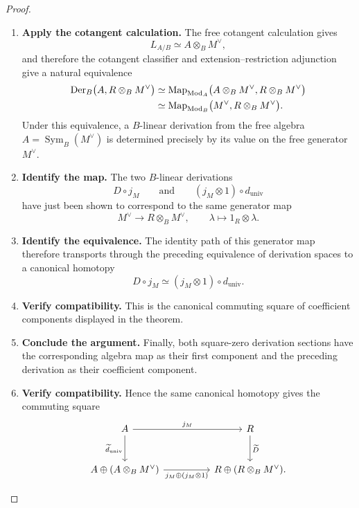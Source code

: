 \begin{proof}
\begin{enumerate}[label=\textup{(\arabic*)}]
    \item \textbf{Apply the cotangent calculation.}
    The free cotangent calculation gives
    \[
            L_{A/B}
            \simeq
            A\otimes_BM^\vee,
        \]
    and therefore the cotangent classifier and extension--restriction adjunction give a natural
    equivalence
    \[
        \begin{aligned}
            \operatorname{Der}_B
            \bigl(A,R\otimes_BM^\vee\bigr)
            &\simeq
            \operatorname{Map}_{\operatorname{Mod}_A}
            \bigl(
                A\otimes_BM^\vee,
                R\otimes_BM^\vee
            \bigr)
            \\
            &\simeq
            \operatorname{Map}_{\operatorname{Mod}_B}
            \bigl(
                M^\vee,
                R\otimes_BM^\vee
            \bigr).
        \end{aligned}
        \]
    Under this equivalence, a \(B\)-linear derivation from the free algebra \(A=\operatorname{Sym}_B(M^\vee)\) is
    determined precisely by its value on the free generator \(M^\vee\).

    \item \textbf{Identify the map.}
    The two \(B\)-linear derivations
    \[
            D\circ j_M
            \qquad\text{and}\qquad
            (j_M\otimes1)\circ d_{\mathrm{univ}}
        \]
    have just been shown to correspond to the same generator map
    \[
            M^\vee
            \longrightarrow
            R\otimes_BM^\vee,
            \qquad
            \lambda\longmapsto1_R\otimes\lambda.
        \]

    \item \textbf{Identify the equivalence.}
    The identity path of this generator map therefore transports through the preceding
    equivalence of derivation spaces to a canonical homotopy
    \[
            D\circ j_M
            \simeq
            (j_M\otimes1)\circ d_{\mathrm{univ}}.
        \]

    \item \textbf{Verify compatibility.}
    This is the canonical commuting square of coefficient components displayed in the theorem.

    \item \textbf{Conclude the argument.}
    Finally, both square-zero derivation sections have the corresponding algebra map as their
    first component and the preceding derivation as their coefficient component.

    \item \textbf{Verify compatibility.}
    Hence the same canonical homotopy gives the commuting square
    \[
        \begin{tikzcd}[column sep=huge,row sep=large]
            A \arrow[r,"j_M"] \arrow[d,"\widetilde d_{\mathrm{univ}}"']
                & R \arrow[d,"\widetilde D"]
            \\
            A\oplus(A\otimes_BM^\vee)
                \arrow[r,"{j_M\oplus(j_M\otimes1)}"']
                &
            R\oplus(R\otimes_BM^\vee).
        \end{tikzcd}
        \]


\end{enumerate}
\end{proof}

